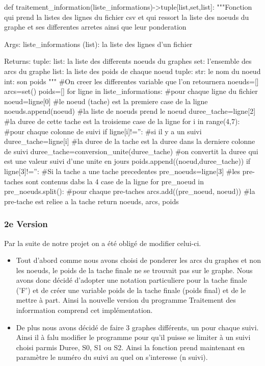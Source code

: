 \documentclass{article}
\begin{document}
\begin{python}
def traitement_information(liste_informations)->tuple[list,set,list]:
    """Fonction qui prend la listes des lignes du fichier csv et qui ressort la liste des noeuds du graphe et ses differentes arretes ainsi que leur ponderation

    Args:
        liste_informations (list): la liste des lignes d'un fichier

    Returns:
        tuple: 
            list: la liste des differents noeuds du graphes 
            set: l'ensemble des arcs du graphe
            list: la liste des poids de chaque noeud
                tuple: 
                    str: le nom du noeud
                    int: son poids
    """
    #On creer les differentes variable que l'on retournera
    noeuds=[]
    arcs=set()
    poids=[]
    for ligne in liste_informations: #pour chaque ligne du fichier
        noeud=ligne[0] #le noeud (tache) est la premiere case de la ligne
        noeuds.append(noeud) #la liste de noeuds prend le noeud
        duree_tache=ligne[2] #la duree de cette tache est la troisieme case de la ligne
        for i in range(4,7): #pour chaque colonne de suivi
            if ligne[i]!='': #si il y a un suivi
                duree_tache=ligne[i] #la duree de la tache est la duree dans la derniere colonne de suivi
        duree_tache=conversion_unite(duree_tache) #on convertit la duree qui est une valeur suivi d'une unite en jours
        poids.append((noeud,duree_tache)) 
        if ligne[3]!='': #Si la tache a une tache precedentes 
            pre_noeuds=ligne[3] #les pre-taches sont contenus dabs la 4 case de la ligne
            for pre_noeud in pre_noeuds.split(): #pour chaque pre-taches
                arcs.add((pre_noeud, noeud)) #la pre-tache est reliee a la tache
    return noeuds, arcs, poids
\end{python}


\subsubsection{2e Version}
Par la suite de notre projet on a été obligé de modifier celui-ci. 
\begin{itemize}
    \item Tout d'abord comme nous avons choisi de ponderer les arcs du graphes et non les noeuds, le poids de la tache finale ne se trouvait pas sur le graphe. Nous avons donc décidé d'adopter une notation particuliere pour la tache finale ('F') et de créer une variable poids de la tache finale (poids final) et de le mettre à part. Ainsi la nouvelle version du programme Traitement des inforrmation comprend cet implémentation.

    \item De plus nous avons décidé de faire 3 graphes différents, un pour chaque suivi. Ainsi il à falu modifier le programme pour qu'il puisse se limiter à un suivi choisi parmis Duree, S0, S1 ou S2. Ainsi la fonction prend maintenant en paramètre le numéro du suivi au quel on s'interesse (n suivi).
\end{itemize}
\end{document}
